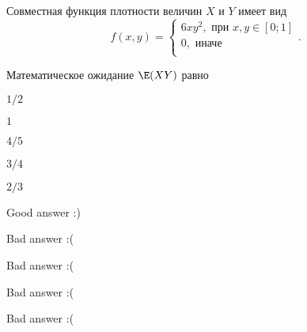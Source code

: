 
\begin{question}
Совместная функция плотности величин \(X\) и \(Y\) имеет вид \[
f(x,y) =
\begin{cases}
6xy^2, \text{ при } x, y \in [0;1] \\
0, \text{ иначе } \\
\end{cases}.
\]

Математическое ожидание \(\E(XY)\) равно
\begin{answerlist}
  \item \(1/2\)
  \item \(1\)
  \item \(4/5\)
  \item \(3/4\)
  \item \(2/3\)
\end{answerlist}
\end{question}

\begin{solution}
\begin{answerlist}
  \item Good answer :)
  \item Bad answer :(
  \item Bad answer :(
  \item Bad answer :(
  \item Bad answer :(
\end{answerlist}
\end{solution}


